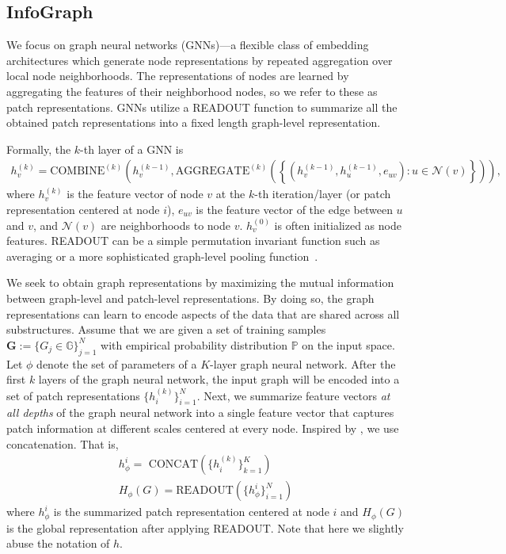 \documentclass{article} \usepackage{iclr2020_conference,times}
\newcommand{\PP}{\mathbb{P}}
\def\method{InfoGraph}
\begin{document}
\subsection{\method{}}


We focus on graph neural networks (GNNs)---a flexible class of embedding architectures which generate node representations by repeated aggregation over local node neighborhoods. The representations of nodes are learned by aggregating the features of their neighborhood nodes, so we refer to these as patch representations. GNNs utilize a READOUT function to summarize all the obtained patch representations into a fixed length graph-level representation.

Formally, the $k$-th layer of a GNN is 
\begin{align}
    h_v^{(k)}   = \text{COMBINE}^{(k)} \left( h_v^{(k-1)},\text{AGGREGATE}^{(k)} \left( \left\lbrace \left(h_v^{(k-1)}, h_u^{(k-1)}, e_{uv} \right)  : u \in \mathcal{N}(v) \right\rbrace \right) \right),
\end{align}
where $h_v^{(k)}$ is the feature vector of node $v$ at the $k$-th iteration/layer (or patch representation centered at node $i$), $e_{uv}$ is the feature vector of the edge between $u$ and $v$, and $\mathcal{N}(v)$ are neighborhoods to node $v$. $h_v^{(0)}$ is often initialized as node features. READOUT can be a simple permutation invariant function such as averaging or a more sophisticated graph-level pooling function~\cite{ying2018hierarchical,zhang2018end}.



We seek to obtain graph representations by maximizing the mutual information between graph-level and patch-level representations. By doing so, the graph representations can learn to encode aspects of the data that are shared across all substructures. Assume that we are given a set of training samples $\mathbf{G} := \{G_j \in \mathbb{G}\}_{j=1}^N$ with empirical probability distribution $\PP$ on the input space. 
Let $\phi$ denote the set of parameters of a $K$-layer graph neural network. After the first $k$ layers of the graph neural network, the input graph will be encoded into a set of patch representations $\{h_{i}^{(k)}\}^{N}_{i=1}$. Next, we summarize feature vectors \emph{at all depths} of the graph neural network into a single feature vector that captures patch information at different scales centered at every node. Inspired by \cite{xu2018representation}, we use concatenation. That is,
\begin{align}
h_{\phi}^{i} = \text{ CONCAT}(\{h_{i}^{(k)}\}_{k=1}^{K})\\
H_{\phi}(G) = \text{READOUT}(\{h_{\phi}^{i}\}^{N}_{i=1})
\end{align}
where $h_{\phi}^{i}$ is the summarized patch representation centered at node $i$ and $H_{\phi}(G)$ is the global representation after applying READOUT. Note that here we slightly abuse the notation of $h$.
\end{document}
